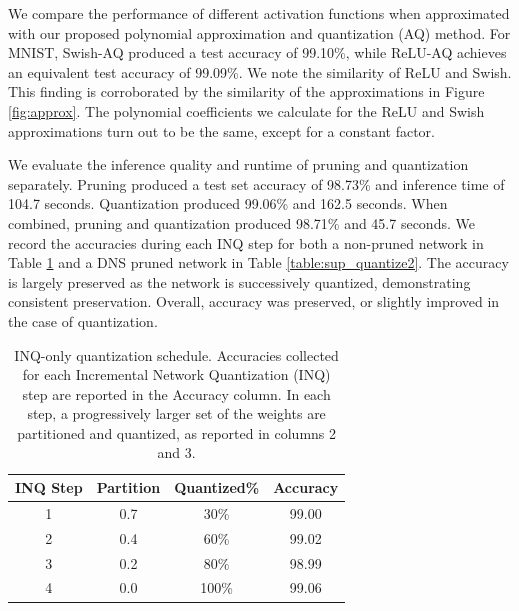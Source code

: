\documentclass[conference]{IEEEtran}
\begin{document}
We compare the performance of different activation functions when approximated with our proposed polynomial approximation and quantization (AQ) method.
For MNIST, Swish-AQ produced a test accuracy of 99.10\%, while ReLU-AQ achieves an equivalent test accuracy of 99.09\%.  
We note the similarity of ReLU and Swish.
This finding is corroborated by the similarity of the approximations in Figure \ref{fig:approx}.
The polynomial coefficients we calculate for the ReLU and Swish approximations turn out to be the same, except for a constant factor.


We evaluate the inference quality and runtime of pruning and quantization separately.
Pruning produced a test set accuracy of 98.73\% and inference time of 104.7 seconds.
Quantization produced 99.06\% and 162.5 seconds.
When combined, pruning and quantization produced 98.71\% and 45.7 seconds.
We record the accuracies during each INQ step for both a non-pruned network in Table \ref{table:sup_quantize1} and a DNS pruned network in Table \ref{table:sup_quantize2}.
The accuracy is largely preserved as the network is successively quantized, demonstrating consistent preservation.
Overall, accuracy was preserved, or slightly improved in the case of quantization. 
\begin{table}[!htbp]
    \centering
    \small
    \begin{tabular}{@{}c|c|c|c@{}}
    \toprule
    INQ Step &  Partition & Quantized\% & Accuracy \\ \midrule
     1 & 0.7 & 30\% & 99.00 \\
    2 & 0.4 & 60\% & 99.02 \\ 
    3 & 0.2 & 80\% & 98.99 \\ 
    4 & 0.0 & 100\% & 99.06 \\ 
     \bottomrule
    \end{tabular}
    \caption{INQ-only quantization schedule. Accuracies collected for each Incremental Network Quantization (INQ) step are reported in the Accuracy column. In each step, a progressively larger set of the weights are partitioned and quantized, as reported in columns 2 and 3.}
    \label{table:sup_quantize1}
\end{table}
\end{document}
